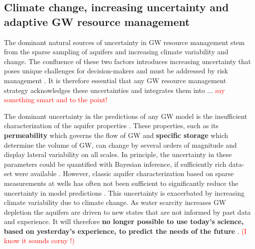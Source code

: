 \documentclass[11pt,final]{article}%
\newcommand{\note}[1]{\textcolor{red}{ #1}}
\begin{document}



\subsection{Climate change, increasing uncertainty and adaptive GW resource management}\label{sec:intro adaptive}
The dominant natural sources of uncertainty in GW resource management stem from the sparse sampling of aquifers and increasing climate variability and change. The confluence of these two factors introduces increasing uncertainty that poses unique challenges for decision-makers and must be addressed by risk management \cite{Shaw2010}. It is therefore essential that any GW resource management strategy acknowledges these uncertainties and integrates them into ... \note{say something smart and to the point!} 

The dominant uncertainty in the predictions of any GW model is the insufficient characterization of the aquifer properties \cite{Eaton2006,Bohling2010,Oliver2011}. These properties, such as its \textbf{permeability} which governs the flow of GW and \textbf{specific storage} which determine the volume of GW, can change by several orders of magnitude and display lateral variability on all scales. In principle, the uncertainty in these parameters could be quantified with Bayesian inference, if sufficiently rich data-set were available \cite{Carrera1986a,Carrera1986b,McLaughlin1996}. However, classic aquifer characterization based on sparse measurements at wells has often not been sufficient to significantly reduce the uncertainty in model predictions \cite{Bohling2010}. This uncertainty is exacerbated by increasing climate variability due to climate change. As water scarcity increases GW depletion the aquifers are driven to new states that are not informed by past data and experience. 
It will therefore \textbf{no longer possible to use today’s science, based on yesterday’s experience, to predict the needs of the future} \cite{Turton2007}. \note{(I know it sounds corny !)}
\end{document}
